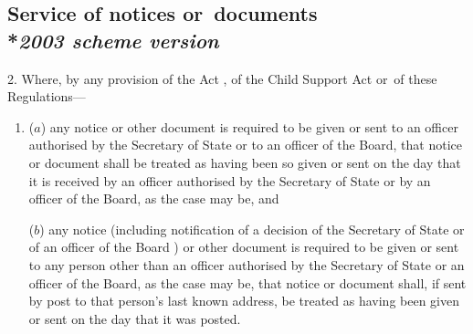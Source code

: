 \documentclass[12pt,a4paper]{article}
\begin{document}
\subsection[2. Service of notices or~documents --- \emph{2003 scheme version}]{Service of notices or~documents\\*\emph{2003 scheme version}}

2.  Where, by any provision of the Act%
, of the Child Support Act
or~of these Regulations—
\begin{enumerate}\item[]
($a$) any notice or other document is required to be given or sent 
to an officer authorised by the Secretary of State
or to an officer of the Board,  %
that notice or document shall be treated as having been so given or sent on the day that it is received 
by an officer authorised by the Secretary of State
or by an officer of the Board,  %
as the case may be, and

($b$) any notice (including notification of a decision of the Secretary of State
or of an officer of the Board%
) or other document is required to be given or sent to any person other than 
an officer  %
authorised by the Secretary of State
or an officer of the Board,  %
as the case may be, that notice or document shall, if sent by post to that person’s last known address, be treated as having been given or sent on the day that it was posted.\end{enumerate}

\end{document}

